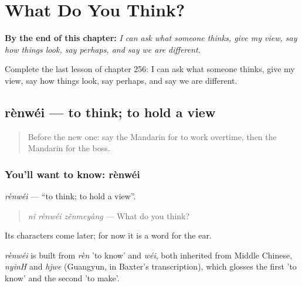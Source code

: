 
\chapter{What Do You Think?}
\label{ch:zh-what-do-you-think}

\begin{chapteropening}
\textbf{By the end of this chapter:} \emph{I can ask what someone thinks, give my view, say how things look, say perhaps, and say we are different.}

Complete the last lesson of chapter 256: I can ask what someone thinks, give my view, say how things look, say perhaps, and say we are different.
\end{chapteropening}

\section[rènwéi]{rènwéi — to think; to hold a view}

\label{lesson:ZH-C256-renwei}



\begin{quote}
Before the new one: say the Mandarin for to work overtime, then the Mandarin for the boss.
\end{quote}

\subsection*{You'll want to know: rènwéi}
\emph{rènwéi} — \textquotedblleft{}to think; to hold a view\textquotedblright{}.

\begin{quote}
\emph{nǐ rènwéi zěnmeyàng} — What do you think?
\end{quote}

Its characters come later; for now it is a word for the ear.

\begin{cousinweb}
\emph{rènwéi} is built from \emph{rèn} 'to know' and \emph{wéi}, both inherited from Middle Chinese, \emph{nyinH} and \emph{hjwe} (Guangyun, in Baxter's transcription), which glosses the first 'to know' and the second 'to make'.
\end{cousinweb}

